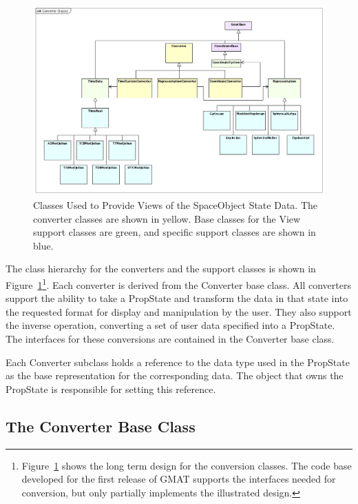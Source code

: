 \begin{figure}[htb]
\begin{center}
\includegraphics[450,293]{Images/ConverterClasses.png}
\caption[Classes Used to Provide Views of the SpaceObject State
Data]{\label{figure:SpaceObjectMVCClasses}Classes Used to Provide Views of the SpaceObject
State Data.  The converter classes are shown in yellow.  Base classes for the View support classes
are green, and specific support classes are shown in blue.}
\end{center}
\end{figure}

The class hierarchy for the converters and the support classes is shown in
Figure~\ref{figure:SpaceObjectMVCClasses}\footnote{Figure~\ref{figure:SpaceObjectMVCClasses} shows
the long term design for the conversion classes.  The code base developed for the first release of
GMAT supports the interfaces needed for conversion, but only partially implements the illustrated
design.}.  Each converter is derived from the Converter base class.  All converters support the
ability to take a PropState and transform the data in that state into the requested format for
display and manipulation by the user.  They also support the inverse operation, converting a set of
user data specified into a PropState.  The interfaces for these conversions are contained in the
Converter base class.

Each Converter subclass holds a reference to the data type used in the PropState as the base
representation for the corresponding data.  The object that owns the PropState is responsible for
setting this reference.

\subsection{The Converter Base Class}

